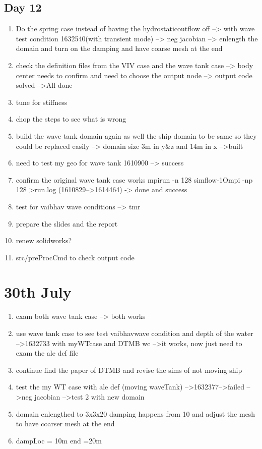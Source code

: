 \documentclass[12pt]{article} %
\begin{document}
\subsection{Day 12}
\begin{enumerate}
    \item Do the spring case instead of having the hydrostaticoutflow off --> with wave test condition  1632540(with transient mode) --> neg jacobian --> enlength the domain and turn on the damping and have coarse mesh at the end
    \item check the definition files from the VIV case and the wave tank case --> body center needs to confirm and need to choose the output node --> output code solved -->All done
    \item tune for stiffness
    \item chop the steps to see what is wrong
    \item build the wave tank domain again as well the ship domain to be same so they could be replaced easily --> domain size 3m in y\&z and 14m in x -->built
    \item need to test my geo for wave tank 1610900 --> success
    \item confirm the original wave tank case works mpirun -n 128 simflow-1Ompi -np 128 >run.log (1610829-->1614464) -> done and success
    \item test for vaibhav wave conditions --> tmr
    \item prepare the slides and the report
    \item renew solidworks?
    \item src/preProcCmd to check output code
\end{enumerate}
\section{30th July}

\begin{enumerate}
    \item exam both wave tank case --> both works
    \item use wave tank case to see test vaibhavwave condition and depth of the water -->1632733 with myWTcase and DTMB wc -->it works, now just need to exam the ale def file
    \item continue find the paper of DTMB and revise the sims of not moving ship
    \item test the my WT case with ale def (moving waveTank) -->1632377-->failed -->neg jacobian -->test 2 with new domain
    \item domain enlengthed to 3x3x20 damping happens from 10 and adjust the mesh to have coarser mesh at the end
    \item dampLoc = 10m end =20m
\end{enumerate}
\end{document}

